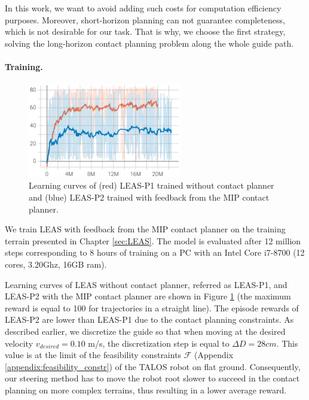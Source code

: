 In this work, we want to avoid adding such costs for computation efficiency purposes. 
Moreover, short-horizon planning can not guarantee completeness, which is not desirable for our task.
That is why, we choose the first strategy, solving the long-horizon contact planning problem along the whole guide path.



\paragraph{Training.}
\begin{figure}[t]
    \centering
    \includegraphics[trim={0 0 0 0},clip,width=0.6\textwidth]{Figures/Chapter_MIP_SL1M/learning_curve_MIP_P1.png}
    \caption{Learning curves of (red) LEAS-P1 trained without contact planner and (blue) LEAS-P2 trained with feedback from the MIP contact planner.}
    \label{fig:mip:learning_curves}
\end{figure}
We train LEAS with feedback from the MIP contact planner on the training terrain presented in Chapter \ref{sec:LEAS}.
The model is evaluated after 12 million steps corresponding to 8 hours of training on a PC with an Intel Core i7-8700 (12 cores, 3.20Ghz, 16GB ram). 

Learning curves of LEAS without contact planner, referred as LEAS-P1, and LEAS-P2 with the MIP contact planner are shown in Figure \ref{fig:mip:learning_curves} (the maximum reward is equal to 100 for trajectories in a straight line).
The episode rewards of LEAS-P2 are lower than LEAS-P1 due to the contact planning constraints. 
As described earlier, we discretize the guide so that when moving at the desired velocity $v_{desired}=0.10$ m/s, the discretization step is equal to $\Delta D=28cm$. 
This value is at the limit of the feasibility constraints $\mathcal{F}$ (Appendix \ref{appendix:feasibility_constr}) of the TALOS robot on flat ground. 
Consequently, our steering method has to move the robot root slower to succeed in the contact planning on more complex terrains, thus resulting in a lower average reward.



